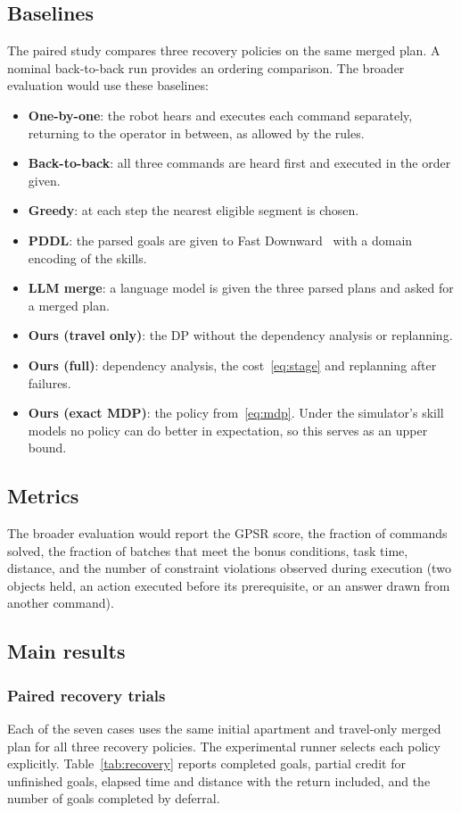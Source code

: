 \documentclass[conference]{IEEEtran}
\newcommand{\todo}[1]{}
\newcommand{\todo}[1]{\textcolor{red}{[TODO: #1]}}
\begin{document}
\subsection{Baselines}
The paired study compares three recovery policies on the same merged plan.
A nominal back-to-back run provides an ordering comparison. The broader
evaluation would use these baselines:
\begin{itemize}
  \item \textbf{One-by-one}: the robot hears and executes each command
    separately, returning to the operator in between, as allowed by the rules.
  \item \textbf{Back-to-back}: all three commands are heard first and executed
    in the order given.
  \item \textbf{Greedy}: at each step the nearest eligible segment is chosen.
  \item \textbf{PDDL}: the parsed goals are given to Fast
    Downward~\cite{fastdownward} with a domain encoding of the skills.
    \todo{Write the domain.}
  \item \textbf{LLM merge}: a language model is given the three parsed plans
    and asked for a merged plan. \todo{Model and prompt.}
  \item \textbf{Ours (travel only)}: the DP without the dependency analysis
    or replanning.
  \item \textbf{Ours (full)}: dependency analysis, the cost~\eqref{eq:stage}
    and replanning after failures.
  \item \textbf{Ours (exact MDP)}: the policy from~\eqref{eq:mdp}. Under the
    simulator's skill models no policy can do better in expectation, so this
    serves as an upper bound.
\end{itemize}

\subsection{Metrics}
The broader evaluation would report the GPSR score, the fraction of
commands solved, the fraction of batches that meet the bonus conditions,
task time, distance, and the number of
constraint violations observed during execution (two objects held, an action
executed before its prerequisite, or an answer drawn from another command).

\subsection{Main results}
\subsubsection{Paired recovery trials}
Each of the seven cases uses the same initial apartment and travel-only
merged plan for all three recovery policies. The experimental runner
selects each policy explicitly. Table~\ref{tab:recovery} reports completed
goals, partial credit for unfinished goals, elapsed time and distance with
the return included, and the number of goals completed by deferral.
\end{document}
